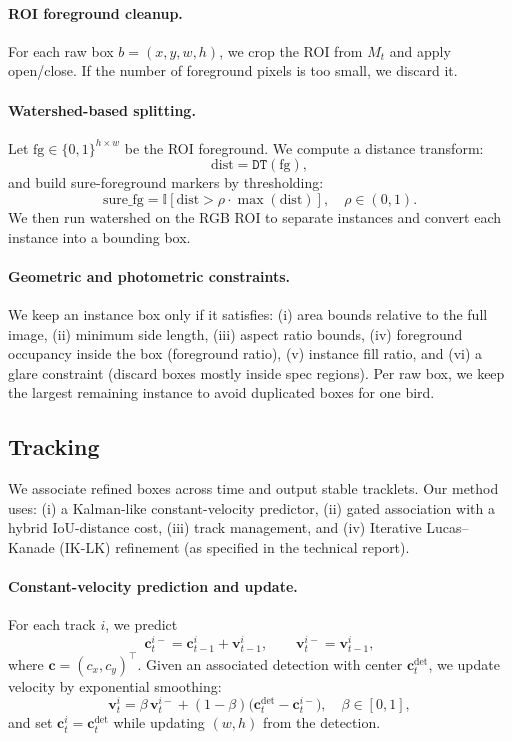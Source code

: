 \paragraph{ROI foreground cleanup.}
For each raw box $b=(x,y,w,h)$, we crop the ROI from $M_t$ and apply open/close. If the number of foreground pixels is too small, we discard it.

\paragraph{Watershed-based splitting.}
Let $\text{fg}\in\{0,1\}^{h\times w}$ be the ROI foreground. We compute a distance transform:
\begin{equation}
\text{dist}=\texttt{DT}(\text{fg}),
\end{equation}
and build sure-foreground markers by thresholding:
\begin{equation}
\text{sure\_fg}=\mathbb{I}\left[\text{dist} > \rho\cdot \max(\text{dist})\right],\quad \rho\in(0,1).
\end{equation}
We then run watershed on the RGB ROI to separate instances and convert each instance into a bounding box.

\paragraph{Geometric and photometric constraints.}
We keep an instance box only if it satisfies:
(i) area bounds relative to the full image,
(ii) minimum side length,
(iii) aspect ratio bounds,
(iv) foreground occupancy inside the box (foreground ratio),
(v) instance fill ratio,
and (vi) a glare constraint (discard boxes mostly inside spec regions).
Per raw box, we keep the largest remaining instance to avoid duplicated boxes for one bird.

\subsection{Tracking}
We associate refined boxes across time and output stable tracklets. Our method uses: (i) a Kalman-like constant-velocity predictor,
(ii) gated association with a hybrid IoU-distance cost, (iii) track management, and (iv) Iterative Lucas--Kanade (IK-LK) refinement (as specified in the technical report).

\paragraph{Constant-velocity prediction and update.}
For each track $i$, we predict
\begin{equation}
\mathbf{c}^{i-}_t=\mathbf{c}^i_{t-1}+\mathbf{v}^i_{t-1},\qquad \mathbf{v}^{i-}_t=\mathbf{v}^i_{t-1},
\end{equation}
where $\mathbf{c}=(c_x,c_y)^\top$.
Given an associated detection with center $\mathbf{c}^{\text{det}}_t$, we update velocity by exponential smoothing:
\begin{equation}
\mathbf{v}^i_t = \beta\,\mathbf{v}^{i-}_t + (1-\beta)\big(\mathbf{c}^{\text{det}}_t-\mathbf{c}^{i-}_t\big),\quad \beta\in[0,1],
\end{equation}
and set $\mathbf{c}^i_t=\mathbf{c}^{\text{det}}_t$ while updating $(w,h)$ from the detection.

